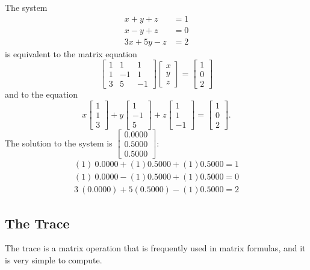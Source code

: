 \documentclass[../main.tex]{subfiles}
\begin{document}
\begin{example}
The system
$$
\begin{aligned}
x+y+z &=1 \\
x-y+z &=0 \\
3 x+5 y-z &=2
\end{aligned}
$$
is equivalent to the matrix equation
$$
\begin{bmatrix}
1 & 1 & 1 \\
1 & -1 & 1 \\
3 & 5 & -1
\end{bmatrix}\begin{bmatrix}
x \\
y \\
z
\end{bmatrix}=\begin{bmatrix}
1 \\
0 \\
2
\end{bmatrix}
$$
and to the equation
$$
x\begin{bmatrix}
1 \\
1 \\
3
\end{bmatrix}+y\begin{bmatrix}
1 \\
-1 \\
5
\end{bmatrix}+z\begin{bmatrix}
1 \\
1 \\
-1
\end{bmatrix}=\begin{bmatrix}
1 \\
0 \\
2
\end{bmatrix}.
$$
The solution to the system is $\begin{bmatrix}0.0000 \\ 0.5000 \\ 0.5000\end{bmatrix}$:
$$
\begin{aligned}
	 (1) ~0.0000 + (1) 0.5000 + (1)  0.5000=1 \nonumber \\
	 (1) ~0.0000 - (1) 0.5000 +  (1)  0.5000=0  \nonumber \\
	3  ~(0.0000)+5(0.5000)-(1) 0.5000=2
\end{aligned}
$$
\end{example}
\subsection {The Trace}
The trace is a matrix operation that is frequently used in matrix formulas, and it is very simple to compute.
\end{document}
